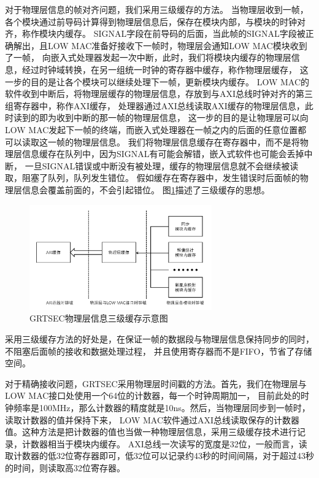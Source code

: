 	对于物理层信息的帧对齐问题，我们采用三级缓存的方法。
	当物理层收到一帧，各个模块通过前导码计算得到物理层信息后，保存在模块内部，与模块的时钟对齐，称作模块内缓存。
	SIGNAL字段在前导码的后面，当此帧的SIGNAL字段被正确解出，且LOW MAC准备好接收下一帧时，物理层会通知LOW MAC模块收到了一帧，
	向嵌入式处理器发起一次中断，此时，我们将模块内缓存的物理层信息，经过时钟域转换，在另一组统一时钟的寄存器中缓存，称作物理层缓存，
	这一步的目的是让各个模块可以继续处理下一帧，更新模块内缓存。
	LOW MAC的软件收到中断后，将物理层缓存的物理层信息，存放到与AXI总线时钟对齐的第三组寄存器中，称作AXI缓存，
	处理器通过AXI总线读取AXI缓存的物理层信息，此时读到的即为收到中断的那一帧的物理层信息，
	这一步的目的是让物理层可以向LOW MAC发起下一帧的终端，而嵌入式处理器在一帧之内的后面的任意位置都可以读取这一帧的物理层信息。
	我们将物理层信息缓存在寄存器中，而不是将物理层信息缓存在队列中，因为SIGNAL有可能会解错，嵌入式软件也可能会丢掉中断，
	一旦SIGNAL错误或中断没有被处理，缓存的物理层信息就不会继续被读取，阻塞了队列，队列发生错位。
	假如缓存在寄存器中，发生错误时后面帧的物理层信息会覆盖前面的，不会引起错位。
	图\ref{fig:phy_info_cache}描述了三级缓存的思想。
		\begin{figure}
			\centering
			\includegraphics[width=0.7\textwidth]{img/phy_info_cache.png}
			\caption{GRTSEC物理层信息三级缓存示意图}
			\label{fig:phy_info_cache}
		\end{figure}

	采用三级缓存方法的好处是，在保证一帧的数据段与物理层信息保持同步的同时，不阻塞后面帧的接收和数据处理过程，
	并且使用寄存器而不是FIFO，节省了存储空间。

	对于精确接收问题，GRTSEC采用物理层时间戳的方法。首先，我们在物理层与LOW MAC接口处使用一个64位的计数器，每一个时钟周期加一，
	目前此处的时钟频率是100MHz，那么计数器的精度就是10ns。然后，当物理层同步到一帧时，读取计数器的值并保持下来，
	LOW MAC软件通过AXI总线读取保存的计数器值。这种方法是把计数器的值也当做一种物理层信息，采用三级缓存技术进行记录，计数器相当于模块内缓存。
	AXI总线一次读写的宽度是32位，一般而言，读取计数器的低32位寄存器即可，低32位可以记录约43秒的时间间隔，对于超过43秒的时间，则读取高32位寄存器。


